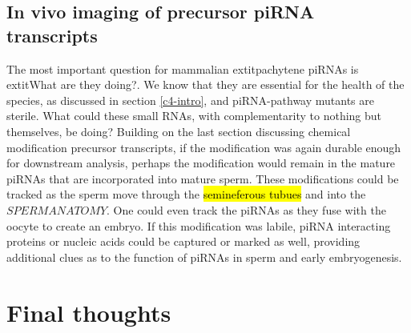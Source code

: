   \subsection{In vivo imaging of precursor piRNA transcripts}
    The most important question for mammalian   extit{pachytene} piRNAs is   extit{What are they doing?}. We know that they are essential for the health of the species, as discussed in section \ref{c4-intro}, and piRNA-pathway mutants are sterile. What could these small RNAs, with complementarity to nothing but themselves, be doing? Building on the last section discussing chemical modification precursor transcripts, if the modification was again durable enough for downstream analysis, perhaps the modification would remain in the mature piRNAs that are incorporated into mature sperm. These modifications could be tracked as the sperm move through the \hl{semineferous tubues} and into the $SPERM ANATOMY$. One could even track the piRNAs as they fuse with the oocyte to create an embryo. If this modification was labile, piRNA interacting proteins or nucleic acids could be captured or marked as well, providing additional clues as to the function of piRNAs in sperm and early embryogenesis.

\section{Final thoughts}



